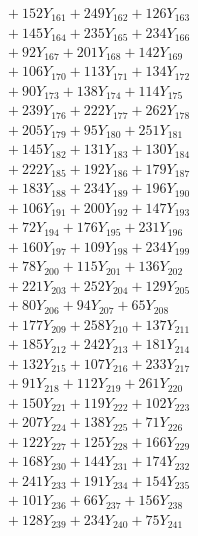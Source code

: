 \documentclass[a4paper,10pt]{article}
\begin{document}
{\begin{align}
&\;  + 152 Y_{161} + 249 Y_{162} + 126 Y_{163} \\[0.3ex]
&\;  + 145 Y_{164} + 235 Y_{165} + 234 Y_{166} \\[0.3ex]
&\;  + 92 Y_{167} + 201 Y_{168} + 142 Y_{169} \\[0.3ex]
&\;  + 106 Y_{170} + 113 Y_{171} + 134 Y_{172} \\[0.3ex]
&\;  + 90 Y_{173} + 138 Y_{174} + 114 Y_{175} \\[0.3ex]
&\;  + 239 Y_{176} + 222 Y_{177} + 262 Y_{178} \\[0.5ex]\allowbreak
&\;  + 205 Y_{179} + 95 Y_{180} + 251 Y_{181} \\[0.3ex]
&\;  + 145 Y_{182} + 131 Y_{183} + 130 Y_{184} \\[0.3ex]
&\;  + 222 Y_{185} + 192 Y_{186} + 179 Y_{187} \\[0.3ex]
&\;  + 183 Y_{188} + 234 Y_{189} + 196 Y_{190} \\[0.3ex]
&\;  + 106 Y_{191} + 200 Y_{192} + 147 Y_{193} \\[0.3ex]
&\;  + 72 Y_{194} + 176 Y_{195} + 231 Y_{196} \\[0.3ex]
&\;  + 160 Y_{197} + 109 Y_{198} + 234 Y_{199} \\[0.3ex]
&\;  + 78 Y_{200} + 115 Y_{201} + 136 Y_{202} \\[0.3ex]
&\;  + 221 Y_{203} + 252 Y_{204} + 129 Y_{205} \\[0.3ex]
&\;  + 80 Y_{206} + 94 Y_{207} + 65 Y_{208} \\[0.5ex]\allowbreak
&\;  + 177 Y_{209} + 258 Y_{210} + 137 Y_{211} \\[0.3ex]
&\;  + 185 Y_{212} + 242 Y_{213} + 181 Y_{214} \\[0.3ex]
&\;  + 132 Y_{215} + 107 Y_{216} + 233 Y_{217} \\[0.3ex]
&\;  + 91 Y_{218} + 112 Y_{219} + 261 Y_{220} \\[0.3ex]
&\;  + 150 Y_{221} + 119 Y_{222} + 102 Y_{223} \\[0.3ex]
&\;  + 207 Y_{224} + 138 Y_{225} + 71 Y_{226} \\[0.3ex]
&\;  + 122 Y_{227} + 125 Y_{228} + 166 Y_{229} \\[0.3ex]
&\;  + 168 Y_{230} + 144 Y_{231} + 174 Y_{232} \\[0.3ex]
&\;  + 241 Y_{233} + 191 Y_{234} + 154 Y_{235} \\[0.3ex]
&\;  + 101 Y_{236} + 66 Y_{237} + 156 Y_{238} \\[0.5ex]\allowbreak
&\;  + 128 Y_{239} + 234 Y_{240} + 75 Y_{241} \\[0.3ex]

\end{align}}
\end{document}
